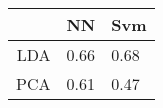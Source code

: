\begin{tabular}{|r|l|l|}
  \hline
    & NN & Svm \\
  \hline
  LDA & 0.66 & 0.68 \\
  \hline
  PCA & 0.61 & 0.47 \\
  \hline
\end{tabular}
